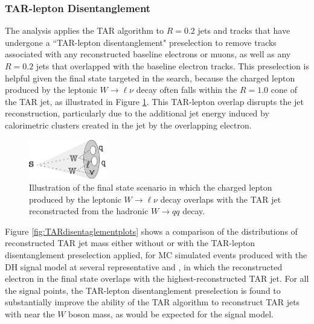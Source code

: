 \subsubsection{TAR-lepton Disentanglement}

The analysis applies the TAR algorithm to \(R=0.2\) \smallR jets and tracks that have undergone a ``TAR-lepton disentanglement" preselection to remove tracks associated with any reconstructed baseline electrons or muons, as well as any \(R=0.2\) jets that overlapped with the baseline electron tracks. This preselection is helpful given the final state targeted in the search, because the charged lepton produced by the leptonic \(W\rightarrow \ell\nu\) decay often falls within the \(R=1.0\) cone of the TAR jet, as illustrated in Figure \ref{fig:TAR_lepton_overlap_illustration}. This TAR-lepton overlap disrupts the jet reconstruction, particularly due to the additional jet energy induced by calorimetric clusters created in the \largeR jet by the overlapping electron.

\begin{figure}[H]
  \centering
     \includegraphics[width = 0.3\textwidth]{Figures/5/lepton_overlap.pdf}
     \caption{Illustration of the final state scenario in which the charged lepton produced by the leptonic \(W\rightarrow \ell\nu\) decay overlaps with the \largeR TAR jet reconstructed from the hadronic \(W\rightarrow qq\) decay.}
     \label{fig:TAR_lepton_overlap_illustration}
  \end{figure}
  
Figure \ref{fig:TARdisentaglementplots} shows a comparison of the distributions of reconstructed TAR jet mass \mTAR either without or with the TAR-lepton disentanglement preselection applied, for MC simulated events produced with the DH signal model at several representative \ms and \mZp, in which the reconstructed electron in the final state overlaps with the highest-\pt reconstructed TAR jet. For all the signal points, the TAR-lepton disentanglement preselection is found to substantially improve the ability of the TAR algorithm to reconstruct TAR jets with \mTAR near the \(W\) boson mass, as would be expected for the signal model.
  
